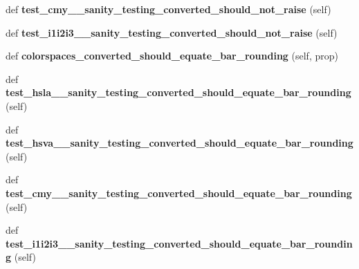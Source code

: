 \begin{DoxyCompactItemize}
def {\bfseries test\+\_\+cmy\+\_\+\+\_\+sanity\+\_\+testing\+\_\+converted\+\_\+should\+\_\+not\+\_\+raise} (self)
\item 
\mbox{\label{classpygame_1_1tests_1_1color__test_1_1_color_type_test_ab7861497f972b626216afc039fd169fa}} 
def {\bfseries test\+\_\+i1i2i3\+\_\+\+\_\+sanity\+\_\+testing\+\_\+converted\+\_\+should\+\_\+not\+\_\+raise} (self)
\item 
\mbox{\label{classpygame_1_1tests_1_1color__test_1_1_color_type_test_a96f341929a596faee3774c0dbbfe8263}} 
def {\bfseries colorspaces\+\_\+converted\+\_\+should\+\_\+equate\+\_\+bar\+\_\+rounding} (self, prop)
\item 
\mbox{\label{classpygame_1_1tests_1_1color__test_1_1_color_type_test_ae4df36176e15a3fef8da6e985089d3f1}} 
def {\bfseries test\+\_\+hsla\+\_\+\+\_\+sanity\+\_\+testing\+\_\+converted\+\_\+should\+\_\+equate\+\_\+bar\+\_\+rounding} (self)
\item 
\mbox{\label{classpygame_1_1tests_1_1color__test_1_1_color_type_test_a02e89b46137a2181ce3b2c72a21d9bbf}} 
def {\bfseries test\+\_\+hsva\+\_\+\+\_\+sanity\+\_\+testing\+\_\+converted\+\_\+should\+\_\+equate\+\_\+bar\+\_\+rounding} (self)
\item 
\mbox{\label{classpygame_1_1tests_1_1color__test_1_1_color_type_test_a404ccb00756a3d580af6fd063d8f9405}} 
def {\bfseries test\+\_\+cmy\+\_\+\+\_\+sanity\+\_\+testing\+\_\+converted\+\_\+should\+\_\+equate\+\_\+bar\+\_\+rounding} (self)
\item 
\mbox{\label{classpygame_1_1tests_1_1color__test_1_1_color_type_test_aad5e042cce676250dfa42dde4e7ea904}} 
def {\bfseries test\+\_\+i1i2i3\+\_\+\+\_\+sanity\+\_\+testing\+\_\+converted\+\_\+should\+\_\+equate\+\_\+bar\+\_\+rounding} (self)
\item 
\mbox{\label{classpygame_1_1tests_1_1color__test_1_1_color_type_test_a34531933d8c1ff502f42751ccd7d0ff6}} 

\end{DoxyCompactItemize}
